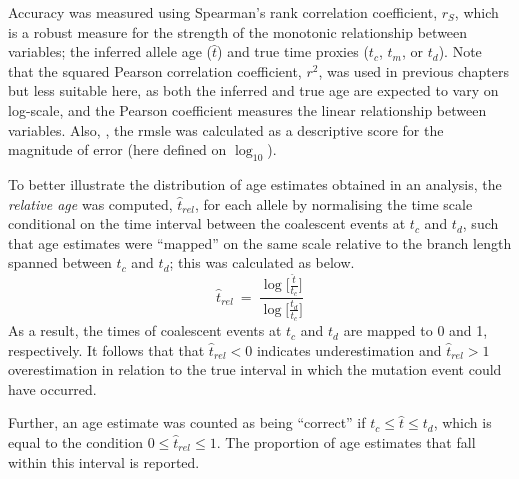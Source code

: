 
Accuracy was measured using Spearman's rank correlation coefficient, $r_S$, which is a robust measure for the strength of the monotonic relationship between  variables; \ie the inferred allele age ($\hat{t}$) and true time proxies ($t_c$, $t_m$, or $t_d$).
Note that the squared Pearson correlation coefficient, $r^2$, was used in previous chapters but  less suitable here, as both the inferred and true age are expected to vary on log-scale, and the Pearson coefficient measures the linear relationship between variables.
Also, , the \gls{rmsle} was calculated as a descriptive score for the magnitude of error (here defined on $\log_{10}$).

To better illustrate the distribution of age estimates obtained in an analysis, the \emph{relative age} was computed, $\hat{t}_\textit{rel}$, for each allele by normalising the time scale conditional on the time interval between the coalescent events at $t_c$ and $t_d$, such that age estimates were ``mapped'' on the same scale relative to the branch length spanned between $t_c$ and $t_d$; this was calculated as below.
\begin{equation}\label{eq:age_relative}
	\hat{t}_\textit{rel} ~=~
	\frac{ \log \big[ \frac{\hat{t}}{t_c} \big] }{ \log \big[ \frac{t_d}{t_c} \big] }
\end{equation}
As a result, the times of coalescent events at $t_c$ and $t_d$ are mapped to 0 and 1, respectively.
It follows that that ${\hat{t}_\textit{rel} < 0}$ indicates underestimation and ${\hat{t}_\textit{rel} > 1}$ overestimation in relation to the true interval in which the mutation event could have occurred.

Further, an age estimate was counted as being ``correct'' if ${t_c \leq \hat{t} \leq t_d}$, which is equal to the condition ${0 \leq \hat{t}_\textit{rel} \leq 1}$.
The proportion of age estimates that fall within this interval is reported.












